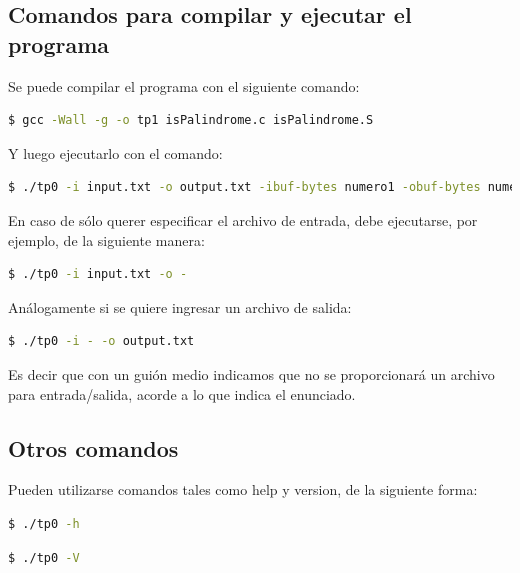 \documentclass[a4paper]{article}
\begin{document}
\subsection{Comandos para compilar y ejecutar el programa}

Se puede compilar el programa con el siguiente comando:

\begin{lstlisting}[language=bash]
  $ gcc -Wall -g -o tp1 isPalindrome.c isPalindrome.S
\end{lstlisting}


Y luego ejecutarlo con el comando:

\begin{lstlisting}[language=bash]
  $ ./tp0 -i input.txt -o output.txt -ibuf-bytes numero1 -obuf-bytes numero2
\end{lstlisting}

En caso de sólo querer especificar el archivo de entrada, debe ejecutarse, por ejemplo, de la siguiente manera:

\begin{lstlisting}[language=bash]
  $ ./tp0 -i input.txt -o -
\end{lstlisting}

Análogamente si se quiere ingresar un archivo de salida:

\begin{lstlisting}[language=bash]
  $ ./tp0 -i - -o output.txt
\end{lstlisting}

Es decir que con un guión medio indicamos que no se proporcionará un archivo para entrada/salida, acorde a lo que indica el enunciado.

\subsection{Otros comandos}

Pueden utilizarse comandos tales como help y version, de la siguiente forma:

\begin{lstlisting}[language=bash]
  $ ./tp0 -h
\end{lstlisting}

\begin{lstlisting}[language=bash]
  $ ./tp0 -V
\end{lstlisting}
\end{document}
